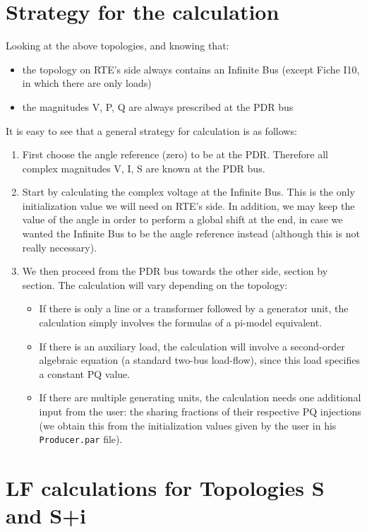 \documentclass[a4paper,11pt]{article}
\newcommand{\code}[1]{\texttt{#1}}  %
\begin{document}
\section{Strategy for the calculation}
Looking at the above topologies, and knowing that:
\begin{itemize}
\item the topology on RTE's side always contains an Infinite Bus (except Fiche I10, in
  which there are only loads)
\item the magnitudes V, P, Q are always prescribed at the PDR bus
\end{itemize}
It is easy to see that a general strategy for calculation is as follows:
\begin{enumerate}
\item First choose the angle reference (zero) to be at the PDR. Therefore all complex
  magnitudes V, I, S are known at the PDR bus.
\item Start by calculating the complex voltage at the Infinite Bus. This is the only
  initialization value we will need on RTE's side. In addition, we may keep the value of
  the angle in order to perform a global shift at the end, in case we wanted the
  Infinite Bus to be the angle reference instead (although this is not really
  necessary).
\item We then proceed from the PDR bus towards the other side, section by section. The
  calculation will vary depending on the topology:
  \begin{itemize}
  \item If there is only a line or a transformer followed by a generator unit, the
    calculation simply involves the formulas of a pi-model equivalent.
  \item If there is an auxiliary load, the calculation will involve a second-order
    algebraic equation (a standard two-bus load-flow), since this load specifies
    a constant PQ value.
  \item If there are multiple generating units, the calculation needs one additional
    input from the user: the sharing fractions of their respective PQ injections (we
    obtain this from the initialization values given by the user in his
    \code{Producer.par} file).
  \end{itemize}
\end{enumerate}




\section{LF calculations for Topologies S and S+i}
\end{document}
